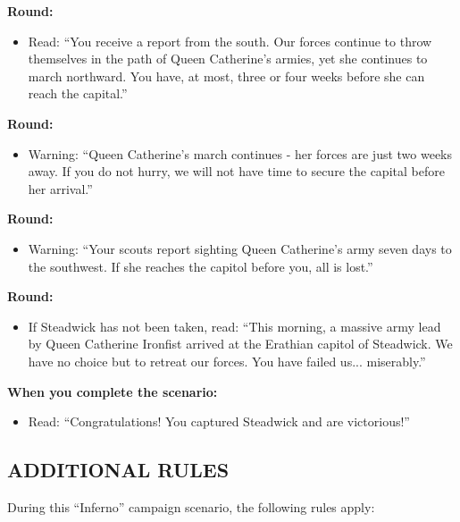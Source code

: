 \begin{multicols*}{2}
\textbf{ Round:}
\begin{itemize}
  \item Read: ``You receive a report from the south. Our forces continue to throw themselves in the path of
    Queen Catherine's armies, yet she continues to march northward. You have, at most, three or four weeks
    before she can reach the capital.''
\end{itemize}

\textbf{ Round:}
\begin{itemize}
  \item Warning: ``Queen Catherine's march continues - her forces are just two weeks away. If you do not hurry,
    we will not have time to secure the capital before her arrival.''
\end{itemize}

\textbf{ Round:}
\begin{itemize}
  \item Warning: ``Your scouts report sighting Queen Catherine's army seven days to the southwest. If she
    reaches the capitol before you, all is lost.''
\end{itemize}

\textbf{ Round:}
\begin{itemize}
  \item If Steadwick has not been taken, read: ``This morning, a massive army lead by Queen Catherine
    Ironfist arrived at the Erathian capitol of Steadwick. We have no choice but to retreat our forces.
    You have failed us... miserably.''
\end{itemize}

\textbf{When you complete the scenario:}
\begin{itemize}
  \item Read: ``Congratulations! You captured Steadwick and are victorious!''
\end{itemize}

\columnbreak

\subsection*{\MakeUppercase{Additional rules}}

During this ``Inferno'' campaign scenario, the following rules apply:


\end{multicols*}
